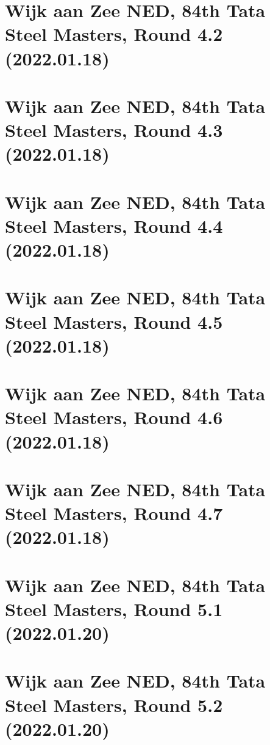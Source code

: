 \documentclass[11pt]{article}
\newcommand*\cleartoleftpage{%
   \clearpage
   \ifodd\value{page}\hbox{}\newpage\fi
}
\begin{document}
\cleartoleftpage

\section{Wijk aan Zee NED, 84th Tata Steel Masters, Round 4.2 (2022.01.18)}


\cleartoleftpage

\section{Wijk aan Zee NED, 84th Tata Steel Masters, Round 4.3 (2022.01.18)}


\cleartoleftpage

\section{Wijk aan Zee NED, 84th Tata Steel Masters, Round 4.4 (2022.01.18)}


\cleartoleftpage

\section{Wijk aan Zee NED, 84th Tata Steel Masters, Round 4.5 (2022.01.18)}


\cleartoleftpage

\section{Wijk aan Zee NED, 84th Tata Steel Masters, Round 4.6 (2022.01.18)}


\cleartoleftpage

\section{Wijk aan Zee NED, 84th Tata Steel Masters, Round 4.7 (2022.01.18)}


\cleartoleftpage

\section{Wijk aan Zee NED, 84th Tata Steel Masters, Round 5.1 (2022.01.20)}


\cleartoleftpage

\section{Wijk aan Zee NED, 84th Tata Steel Masters, Round 5.2 (2022.01.20)}

\end{document}
